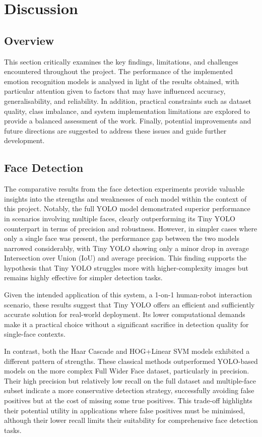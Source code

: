 \chapter{Discussion}

\section{Overview}
This section critically examines the key findings, limitations, and challenges encountered throughout the project. The performance of the implemented emotion recognition models is analysed in light of the results obtained, with particular attention given to factors that may have influenced accuracy, generalisability, and reliability. In addition, practical constraints such as dataset quality, class imbalance, and system implementation limitations are explored to provide a balanced assessment of the work. Finally, potential improvements and future directions are suggested to address these issues and guide further development.

\section{Face Detection}

The comparative results from the face detection experiments provide valuable insights into the strengths and weaknesses of each model within the context of this project. Notably, the full YOLO model demonstrated superior performance in scenarios involving multiple faces, clearly outperforming its Tiny YOLO counterpart in terms of precision and robustness. However, in simpler cases where only a single face was present, the performance gap between the two models narrowed considerably, with Tiny YOLO showing only a minor drop in average Intersection over Union (IoU) and average precision. This finding supports the hypothesis that Tiny YOLO struggles more with higher-complexity images but remains highly effective for simpler detection tasks.

Given the intended application of this system, a 1-on-1 human-robot interaction scenario, these results suggest that Tiny YOLO offers an efficient and sufficiently accurate solution for real-world deployment. Its lower computational demands make it a practical choice without a significant sacrifice in detection quality for single-face contexts.

In contrast, both the Haar Cascade and HOG+Linear SVM models exhibited a different pattern of strengths. These classical methods outperformed YOLO-based models on the more complex Full Wider Face dataset, particularly in precision. Their high precision but relatively low recall on the full dataset and multiple-face subset indicate a more conservative detection strategy, successfully avoiding false positives but at the cost of missing some true positives. This trade-off highlights their potential utility in applications where false positives must be minimised, although their lower recall limits their suitability for comprehensive face detection tasks.


